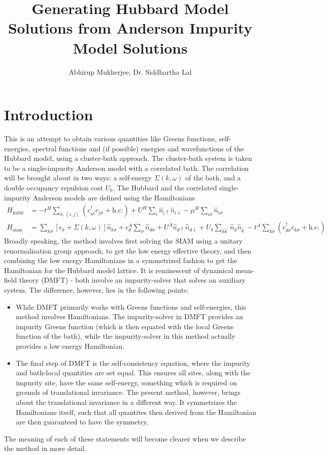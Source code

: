 \documentclass{article}
\title{Generating Hubbard Model Solutions from Anderson Impurity Model Solutions}
\author{Abhirup Mukherjee, Dr. Siddhartha Lal}
\numberwithin{equation}{section}
\begin{document}
\maketitle
\tableofcontents
\newpage
\section{Introduction}
This is an attempt to obtain various quantities like Greens functions, self-energies, spectral functions and (if possible) energies and wavefunctions of the Hubbard model, using a cluster-bath approach. The cluster-bath system is taken to be a single-impurity Anderson model with a correlated bath. The correlation will be brought about in two ways: a self-energy $\Sigma(k,\omega)$ of the bath, and a double occupancy repulsion cost $U_b$. The Hubbard and the correlated single-impurity Anderson models are defined using the Hamiltonians
\begin{align}
H_\text{hubb} &= -t^H\sum_{\sigma,\left<i,j \right>}\left(c^\dagger_{i\sigma} c_{j\sigma} + \text{h.c.}\right) + U^H\sum_i \hat n_{i \uparrow} \hat n_{i \downarrow} - \mu^H \sum_{i\sigma}\hat n_{i\sigma}\\
H_\text{siam} &= \sum_{k\sigma}\left[\epsilon_k + \Sigma(k,\omega)\right]\hat n_{k\sigma} + \epsilon_d^A \sum_\sigma\hat n_{d\sigma} + U^A \hat n_{d \uparrow} \hat n_{d \downarrow} + U_b \sum_{kk^\prime}\hat n_k \hat n_{k^\prime} -t^A\sum_{k\sigma}\left(c^\dagger_{d\sigma}c_{k\sigma} + \text{h.c.}\right) \label{clus_bath_siam}
\end{align}
Broadly speaking, the method involves first solving the SIAM using a unitary renormalisation group approach, to get the low energy effective theory, and then combining the low energy Hamiltonians in a symmetrized fashion to get the Hamiltonian for the Hubbard model lattice. It is reminescent of dynamical mean-field theory (DMFT) - both involve an impurity-solver that solves an auxiliary system. The difference, however, lies in the following points:
\begin{itemize}
	\item While DMFT primarily works with Greens functions and self-energies, this method involves Hamiltonians. The impurity-solver in DMFT provides an impurity Greens function (which is then equated with the local Greens function of the bath), while the impurity-solver in this method actually provides a low energy Hamiltonian.
	\item The final step of DMFT is the self-consistency equation, where the impurity and bath-local quantities are set equal. This ensures all sites, along with the impurity site, have the same self-energy, something which is required on grounds of  translational invariance. The present method, however, brings about the translational invariance in a different way. It symmetrizes the Hamiltonians itself, such that all quantites then derived from the Hamiltonian are then guaranteed to have the symmetry.
\end{itemize}
The meaning of each of these statements will become clearer when we describe the method in more detail.
\end{document}
